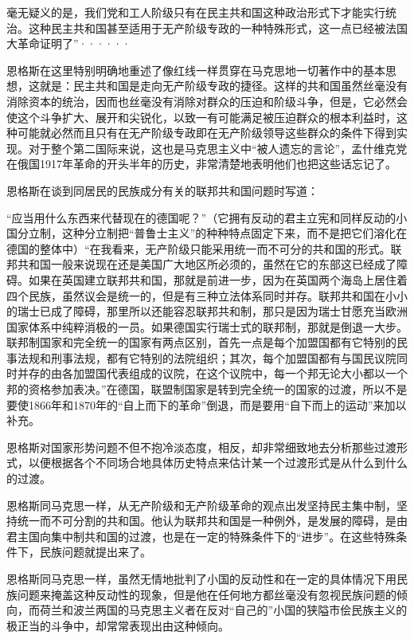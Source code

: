 毫无疑义的是，我们党和工人阶级只有在民主共和国这种政治形式下才能实行统治。这种民主共和国甚至适用于无产阶级专政的一种特殊形式，这一点已经被法国大革命证明了”······

\normalsize
\leftskip=0mm
\pskip

恩格斯在这里特别明确地重述了像红线一样贯穿在马克思地一切著作中的基本思想，这就是：民主共和国是走向无产阶级专政的捷径。这样的共和国虽然丝毫没有消除资本的统治，因而也丝毫没有消除对群众的压迫和阶级斗争，但是，它必然会使这个斗争扩大、展开和尖锐化，以致一有可能满足被压迫群众的根本利益时，这种可能就必然而且只有在无产阶级专政即在无产阶级领导这些群众的条件下得到实现。对于整个第二国际来说，这也是马克思主义中“被人遗忘的言论”，孟什维克党在俄国1917年革命的开头半年的历史，非常清楚地表明他们也把这些话忘记了。

恩格斯在谈到同居民的民族成分有关的联邦共和国问题时写道：

\pskip
\small
\leftskip=10mm

“应当用什么东西来代替现在的德国呢？”（它拥有反动的君主立宪和同样反动的小国分立制，这种分立制把“普鲁士主义”的种种特点固定下来，而不是把它们溶化在德国的整体中）“在我看来，无产阶级只能采用统一而不可分的共和国的形式。联邦共和国一般来说现在还是美国广大地区所必须的，虽然在它的东部这已经成了障碍。如果在英国建立联邦共和国，那就是前进一步，因为在英国两个海岛上居住着四个民族，虽然议会是统一的，但是有三种立法体系同时并存。联邦共和国在小小的瑞士已成了障碍，那里所以还能容忍联邦共和制，那只是因为瑞士甘愿充当欧洲国家体系中纯粹消极的一员。如果德国实行瑞士式的联邦制，那就是倒退一大步。联邦制国家和完全统一的国家有两点区别，首先一点是每个加盟国都有它特别的民事法规和刑事法规，都有它特别的法院组织；其次，每个加盟国都有与国民议院同时并存的由各加盟国代表组成的议院，在这个议院中，每一个邦无论大小都以一个邦的资格参加表决。”在德国，联盟制国家是转到完全统一的国家的过渡，所以不是要使1866年和1870年的“自上而下的革命”倒退，而是要用“自下而上的运动”来加以补充。

\normalsize
\leftskip=0mm
\pskip

恩格斯对国家形势问题不但不抱冷淡态度，相反，却非常细致地去分析那些过渡形式，以便根据各个不同场合地具体历史特点来估计某一个过渡形式是{\kaishu 从什么到什么}的过渡。

恩格斯同马克思一样，从无产阶级和无产阶级革命的观点出发坚持民主集中制，坚持统一而不可分割的共和国。他认为联邦共和国是一种例外，是发展的障碍，是由君主国向集中制共和国的过渡，也是在一定的特殊条件下的“进步”。在这些特殊条件下，民族问题就提出来了。

恩格斯同马克思一样，虽然无情地批判了小国的反动性和在一定的具体情况下用民族问题来掩盖这种反动性的现象，但是他在任何地方都丝毫没有忽视民族问题的倾向，而荷兰和波兰两国的马克思主义者在反对“自己的”小国的狭隘市侩民族主义的极正当的斗争中，却常常表现出由这种倾向。

